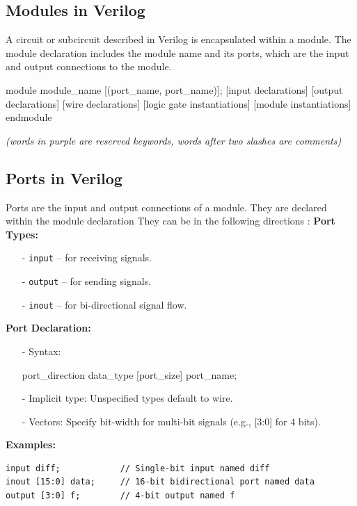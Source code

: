 \documentclass[12pt,openany]{book}
\begin{document}
			      	\subsection{Modules in Verilog}
			      	A circuit or subcircuit described in Verilog is encapsulated within a module. The module declaration includes the module name and its ports, which are the input and output connections to the module.
			      	\begin{vhdl}
module module_name [(port_name{, port_name})];
[input declarations]
[output declarations]
[wire declarations]
[logic gate instantiations]
[module instantiations]
endmodule
			      	\end{vhdl}
			      	\textit{(words in purple are reserved keywords, words after two slashes are comments)} 
			  
			      	\subsection{Ports in Verilog}
			      	Ports are the input and output connections of a module. They are declared within the module declaration
			      	They can be in the following directions :
			      	\textbf{Port Types:}
			      	\begin{itemize}
			      		\item[-] \texttt{input} -- for receiving signals.
			      		\item[-] \texttt{output} -- for sending signals.
			      		\item[-] \texttt{inout} -- for bi-directional signal flow.
			      	\end{itemize}
			      	
			      	\textbf{Port Declaration:}
			      	\begin{itemize}
			      		\item[-] Syntax: 
			      		      \begin{vhdl}
port\_direction data\_type [port\_size] port\_name;
			      		      \end{vhdl}
			      		\item[-] Implicit type: Unspecified types default to wire.
			      		\item[-] Vectors: Specify bit-width for multi-bit signals (e.g., [3:0] for 4 bits).
			      	\end{itemize}
			      	
			      	\textbf{Examples:}
			      	\begin{verbatim}
input diff;            // Single-bit input named diff
inout [15:0] data;     // 16-bit bidirectional port named data
output [3:0] f;        // 4-bit output named f
			      	\end{verbatim}
			      	
\end{document}
